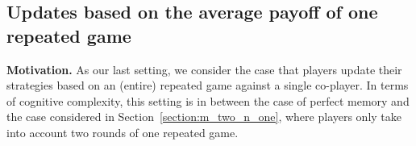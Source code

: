 \documentclass[11pt]{article}
\theoremstyle{plainCl1}
\theoremstyle{plainCl2}
\begin{document}

\subsection{Updates based on the average payoff of one repeated game}\label{section:one_interaction_full_memory}


{\bf Motivation.} As our last setting, we consider the case that players update their strategies based on an (entire) repeated game against a single co-player. In terms of cognitive complexity, this setting is in between the case of perfect memory and the case considered in Section~\ref{section:m_two_n_one}, where players only take into account two rounds of one repeated game.\\
\end{document}
